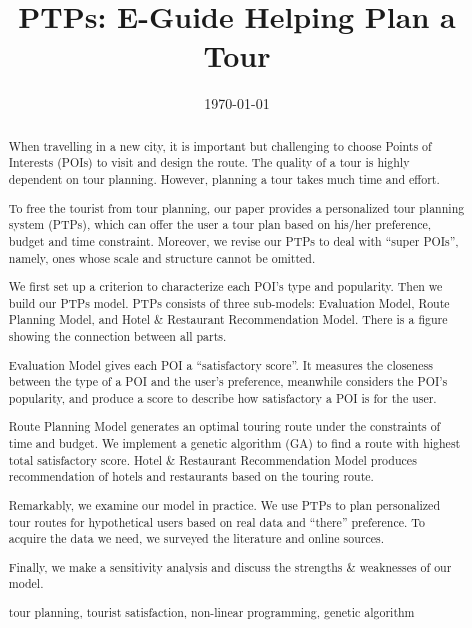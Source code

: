 \documentclass{mcmthesis}
\begin{document}
\linespread{0.6}
\setlength{\parskip}{0.5\baselineskip}
\title{PTPs: E-Guide Helping Plan a Tour}%

\date{\today}
\begin{abstract}
    When travelling in a new city, it is important but challenging to choose Points of Interests (POIs) to visit and design the route. The quality of a tour is highly dependent on tour planning. However, planning a tour takes much time and effort. \par
  To free the tourist from tour planning, our paper provides a personalized tour planning system (PTPs), which can offer the user a tour plan based on his/her preference, budget and time constraint. Moreover, we revise our PTPs to deal with ``super POIs'', namely, ones whose scale and structure cannot be omitted. \par
  We first set up a criterion to characterize each POI's type and popularity. Then we build our PTPs model. PTPs consists of three sub-models: Evaluation Model, Route Planning Model, and Hotel \& Restaurant Recommendation Model. There is a figure showing the connection between all parts.\par
  Evaluation Model gives each POI a ``satisfactory score''. It measures the closeness between the type of a POI and the user's preference, meanwhile considers the POI's popularity, and produce a score to describe how satisfactory a POI is for the user.\par
  Route Planning Model generates an optimal touring route under the constraints of time and budget. We implement a genetic algorithm (GA) to find a route with highest total satisfactory score. Hotel \& Restaurant Recommendation Model produces recommendation of hotels and restaurants based on the touring route. \par
  Remarkably, we examine our model in practice. We use PTPs to plan personalized tour routes for hypothetical users based on real data and ``there'' preference. To acquire the data we need, we surveyed the literature and online sources. \par
  Finally, we make a sensitivity analysis and discuss the strengths \& weaknesses of our model.
	\begin{keywords}
    tour planning, tourist satisfaction, non-linear programming, genetic algorithm
	\end{keywords}
\end{abstract}

\maketitle
\tableofcontents
\end{document}
